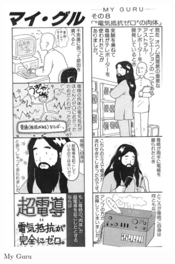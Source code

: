 \documentclass[12pt, letterpaper]{article}
\begin{document}
\begin{figure}[h!]
  \caption{Aum Manga}
  \label{fig:aumManga1}
  \centering
  \begin{subfigure}[b]{.4\linewidth}
    \includegraphics[width=\linewidth]{myGuru.png}
    \caption{My Guru}
  \end{subfigure}
  \begin{subfigure}[b]{.4\linewidth}

\end{subfigure}
\end{figure}
\end{document}
